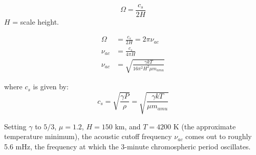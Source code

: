 \begin{equation}
    \Omega = \frac{c_{s}}{2H}
\end{equation}
$H$ = scale height.

\begin{align}
    \Omega &= \frac{c_{s}}{2H} = 2\pi\nu_{ac}\\
    \nu_{ac} &= \frac{c_{s}}{4 \pi H}\\
    \nu_{ac} &= \sqrt{ \frac{\gamma k T }{ 16 \pi^{2} H^{2} \mu m_{amu} } }
\end{align}

where $c_{s}$ is given by:
\begin{equation}
    c_{s} = \sqrt{ \frac{ \gamma P }{ \rho }}
    = \sqrt{ \frac{ \gamma k T }{ \mu m_{amu} }}
\end{equation}

Setting $\gamma$ to $5/3$, $\mu = 1.2$, $H = 150$ km,
and $ T = 4200 $ K (the approximate temperature minimum),
the acoustic cutoff frequency $\nu_{ac}$ comes out to roughly
5.6 mHz, the frequency at which the 3-minute chromospheric
period oscillates.





